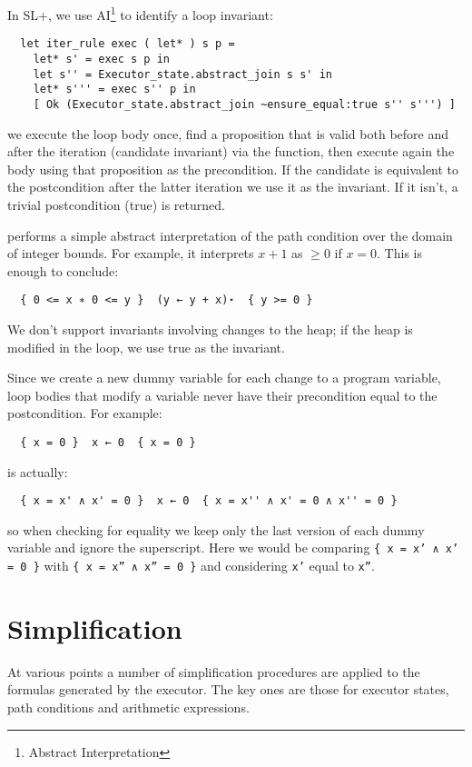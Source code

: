 \documentclass[parskip=half]{scrartcl}
\begin{document}
In SL+, we use AI\footnote{Abstract Interpretation} to identify a loop invariant:
\begin{verbatim}
  let iter_rule exec ( let* ) s p =
    let* s' = exec s p in
    let s'' = Executor_state.abstract_join s s' in
    let* s''' = exec s'' p in
    [ Ok (Executor_state.abstract_join ~ensure_equal:true s'' s''') ]
\end{verbatim}
we execute the loop body once, find a proposition that is valid both before and after the iteration (candidate invariant) via the  function, then execute again the body using that proposition as the precondition. If the candidate is equivalent to the postcondition after the latter iteration we use it as the invariant. If it isn't, a trivial postcondition (true) is returned.

 performs a simple abstract interpretation of the path condition over the domain of integer bounds. For example, it interprets \(x + 1\) as \(\geq 0\) if \(x = 0\). This is enough to conclude:
\begin{verbatim}
  { 0 <= x ∗ 0 <= y }  (y ← y + x)⋆  { y >= 0 }
\end{verbatim}

We don't support invariants involving changes to the heap; if the heap is modified in the loop, we use true as the invariant.

Since we create a new dummy variable for each change to a program variable, loop bodies that modify a variable never have their precondition equal to the postcondition. For example:
\begin{verbatim}
  { x = 0 }  x ← 0  { x = 0 }
\end{verbatim}
is actually:
\begin{verbatim}
  { x = x' ∧ x' = 0 }  x ← 0  { x = x'' ∧ x' = 0 ∧ x'' = 0 }
\end{verbatim}
so when checking for equality we keep only the last version of each dummy variable and ignore the superscript. Here we would be comparing \texttt{\{ x = x' ∧ x' = 0 \}} with \texttt{\{ x = x'' ∧ x'' = 0 \}} and considering \texttt{x'} equal to \texttt{x''}.

\section{Simplification}

At various points a number of simplification procedures are applied to the formulas generated by the executor. The key ones are those for executor states, path conditions and arithmetic expressions.
\end{document}

